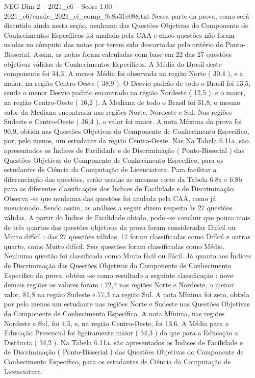 \begin{textsample}{NEG Dim 2 – 2021\_c6 – Score 1.00 – 2021\_c6/enade\_2021\_ci\_comp\_9c8a31e088.txt}
Nessa parte da prova, como será discutido ainda nesta seção, nenhuma das Questões Objetivas do Componente de Conhecimentos Específicos foi anulada pela CAA e cinco questões não foram usadas no cômputo das notas por terem sido descartadas pelo critério do Ponto-Bisserial.
Assim, as notas foram calculadas com base em 22 das 27 questões objetivas válidas de Conhecimentos Específicos.
A Média do Brasil deste componente foi 34,3.
A menor Média foi observada na região Norte ( 30,4 ), e a maior, na região Centro-Oeste ( 38,9 ).
O Desvio padrão de todo o Brasil foi 13,5, sendo o menor Desvio padrão encontrado na região Nordeste ( 12,5 ), e o maior, na região Centro-Oeste ( 16,2 ).
A Mediana de todo o Brasil foi 31,8, o mesmo valor da Mediana encontrada nas regiões Norte, Nordeste e Sul.
Nas regiões Sudeste e Centro-Oeste ( 36,4 ), o valor foi maior.
A nota Máxima da prova foi 90,9, obtida nas Questões Objetivas do Componente de Conhecimento Específico, por, pelo menos, um estudante da região Centro-Oeste.
Nas Na Tabela 6.11a, são apresentados os Índices de Facilidade e de Discriminação ( Ponto-Bisserial ) das Questões Objetivas do Componente de Conhecimento Específico, para os estudantes de Ciência da Computação de Licenciatura.
Para facilitar a diferenciação das questões, serão usadas as mesmas cores da Tabela 6.8a e 6.8b para as diferentes classificações dos Índices de Facilidade e de Discriminação.
Observa -se que nenhuma das questões foi anulada pela CAA, como já mencionado.
Sendo assim, as análises a seguir dizem respeito às 27 questões válidas.
A partir do Índice de Facilidade obtido, pode -se concluir que pouco mais de três quartos das questões objetivas da prova foram consideradas Difícil ou Muito difícil : das 27 questões válidas, 17 foram classificadas como Difícil e outras quarto, como Muito difícil.
Seis questões foram classificadas como Médio.
Nenhuma questão foi classificada como Muito fácil ou Fácil.
Já quanto aos Índices de Discriminação das Questões Objetivas do Componente de Conhecimento Específico da prova, obtém -se como resultado a seguinte classificação : nove demais regiões os valores foram : 72,7 nas regiões Norte e Nordeste, o menor valor, 81,8 na região Sudeste e 77,3 na região Sul.
A nota Mínima foi zero, obtida por pelo menos um estudante nas regiões Norte e Sudeste nas Questões Objetivas do Componente de Conhecimento Específico.
A nota Mínima, nas regiões Nordeste e Sul, foi 4,5, e, na região Centro-Oeste, foi 13,6.
A Média para a Educação Presencial foi ligeiramente maior ( 34,3 ) do que para a Educação a Distância ( 34,2 ).
Na Tabela 6.11a, são apresentados os Índices de Facilidade e de Discriminação ( Ponto-Bisserial ) das Questões Objetivas do Componente de Conhecimento Específico, para os estudantes de Ciência da Computação de Licenciatura.

\end{textsample}
